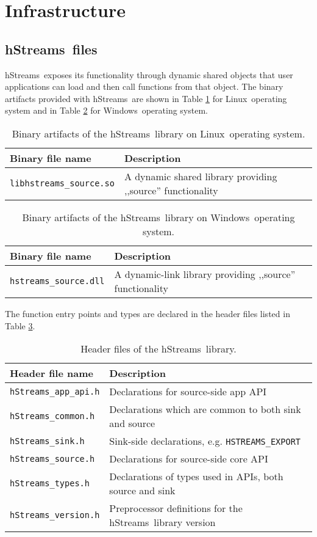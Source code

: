 \documentclass[a4,oneside]{book}
\newcommand{\hstreams}{hStreams}
\newcommand{\windows}{Windows}
\newcommand{\linux}{Linux}
\begin{document}
\section{Infrastructure}
\subsection{\hstreams\ files}
\hstreams\ exposes its functionality through dynamic shared objects that user applications can load and then call functions from that object. The binary artifacts provided with \hstreams\ are shown in Table \ref{tab:hstreams-binaries-linux} for \linux\ operating system and in Table \ref{tab:hstreams-binaries-windows} for \windows\ operating system.
\begin{table}[h]
\begin{tabularx}{\textwidth}{ l X }\hline
  Binary file name & Description \\ \hline
  \texttt{libhstreams\_source.so} & A dynamic shared library providing ,,source'' functionality \\ \hline
\end{tabularx}
\caption{Binary artifacts of the \hstreams\ library on \linux\ operating system.}
\label{tab:hstreams-binaries-linux}
\end{table}

\begin{table}[h]
\begin{tabularx}{\textwidth}{ l X }\hline
  Binary file name & Description \\ \hline
  \texttt{hstreams\_source.dll} & A dynamic-link library providing ,,source'' functionality \\ \hline
\end{tabularx}
\caption{Binary artifacts of the \hstreams\ library on \windows\ operating system.}
\label{tab:hstreams-binaries-windows}
\end{table}

The function entry points and types are declared in the header files listed in Table \ref{tab:hstreams-headers}.
\begin{table}[h]
\begin{tabularx}{\textwidth}{ l X }\hline
  Header file name & Description \\ \hline
  \texttt{hStreams\_app\_api.h} & Declarations for source-side app API \\ \hline
  \texttt{hStreams\_common.h} & Declarations which are common to both sink and source \\ \hline
  \texttt{hStreams\_sink.h} & Sink-side declarations, e.g. \texttt{HSTREAMS\_EXPORT} \\ \hline
  \texttt{hStreams\_source.h} & Declarations for source-side core API \\ \hline
  \texttt{hStreams\_types.h} & Declarations of types used in APIs, both source and sink \\ \hline
  \texttt{hStreams\_version.h} & Preprocessor definitions for the \hstreams\ library version \\ \hline
\end{tabularx}
\caption{Header files of the \hstreams\ library.}
\label{tab:hstreams-headers}
\end{table}
\end{document}
